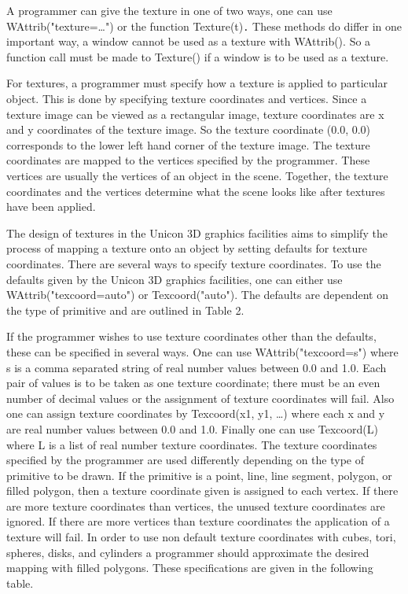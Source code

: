 \documentclass[letterpaper]{article}
\begin{document}
A programmer can give the texture in one of two ways, one can use
\textsf{WAttrib("texture={\dots}") }or the function
\textsf{Texture(t)}\texttt{.} These methods do differ in one important
way, a window cannot be used as a texture with \textsf{WAttrib()}. So
a function call must be made to \textsf{Texture()} if a window is to
be used as a texture.

For textures, a programmer must specify how a texture is applied to
particular object. This is done by specifying texture coordinates and
vertices. Since a texture image can be viewed as a rectangular image,
texture coordinates are x and y coordinates of the texture image. So
the texture coordinate \textsf{(0.0, 0.0)} corresponds to the lower
left hand corner of the texture image. The texture coordinates are
mapped to the vertices specified by the programmer. These vertices are
usually the vertices of an object in the scene. Together, the texture
coordinates and the vertices determine what the scene looks like after
textures have been applied.

The design of textures in the Unicon 3D graphics facilities aims to
simplify the process of mapping a texture onto an object by setting
defaults for texture coordinates. There are several ways to specify
texture coordinates. To use the defaults given by the Unicon 3D
graphics facilities, one can either use
\textsf{WAttrib("texcoord=auto")} or
\textsf{Texcoord("auto")}. The defaults are dependent on the type of
primitive and are outlined in Table 2.

If the programmer wishes to use texture coordinates other than the
defaults, these can be specified in several ways.  One can use
\textsf{WAttrib("texcoord=s")} where \textsf{s} is a comma separated
string of real number values between \textsf{0.0} and
\textsf{1.0}. Each pair of values is to be taken as one texture
coordinate; there must be an even number of decimal values or the
assignment of texture coordinates will fail. Also one can assign
texture coordinates by \textsf{Texcoord(x1, y1, {\dots})} where each
\textsf{x} and \textsf{y} are real number values between \textsf{0.0}
and \textsf{1.0}. Finally one can use \textsf{Texcoord(L)} where
\textsf{L} is a list of real number texture coordinates. The texture
coordinates specified by the programmer are used differently depending
on the type of primitive to be drawn. If the primitive is a point,
line, line segment, polygon, or filled polygon, then a texture
coordinate given is assigned to each vertex. If there are more texture
coordinates than vertices, the unused texture coordinates are
ignored. If there are more vertices than texture coordinates the
application of a texture will fail.  In order to use non default
texture coordinates with cubes, tori, spheres, disks, and cylinders a
programmer should approximate the desired mapping with filled
polygons. These specifications are given in the following table.
\end{document}
